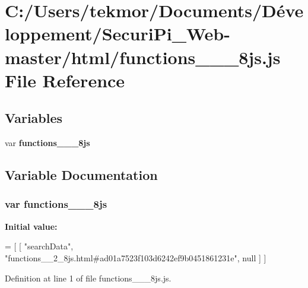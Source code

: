 \section{C\+:/\+Users/tekmor/\+Documents/\+Développement/\+Securi\+Pi\+\_\+\+Web-\/master/html/functions\+\_\+\+\_\+\_\+8js.js File Reference}
\label{functions____2__8js_8js}
\subsection*{Variables}
\begin{DoxyCompactItemize}
\item 
var {\bf functions\+\_\+\+\_\+\_\+8js}
\end{DoxyCompactItemize}


\subsection{Variable Documentation}
\subsubsection[{functions\+\_\+\+\_\+2\+\_\+8js}]{\setlength{\rightskip}{0pt plus 5cm}var functions\+\_\+\+\_\+\_\+8js}\label{functions____2__8js_8js_a7545eebd457a591a8da91798cfc2ad1d}
{\bfseries Initial value\+:}
\begin{DoxyCode}
=
[
    [ \textcolor{stringliteral}{"searchData"}, \textcolor{stringliteral}{"functions\_\_2\_8js.html#ad01a7523f103d6242ef9b0451861231e"}, null ]
]
\end{DoxyCode}


Definition at line 1 of file functions\+\_\+\+\_\+\_\+8js.\+js.

